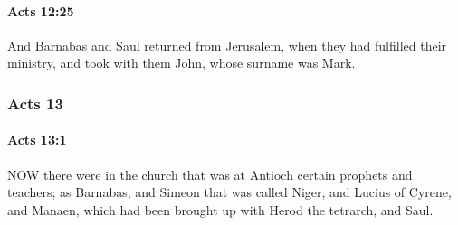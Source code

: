 		\paragraph{Acts 12:25} %
			\label{ACTS-12-25}

			And Barnabas and Saul returned from Jerusalem, when they had fulfilled their ministry, and took with them John, whose surname was Mark.

			\begin{framed}
			\scriptsize
				\begin{compactdesc}
					\item[SBLG] 
				\end{compactdesc}
			\end{framed}

	\subsubsection{Acts 13} %
		\label{ACTS-13}
		
		\paragraph{Acts 13:1} %
			\label{ACTS-13-1}

			NOW there were in the church that was at Antioch certain prophets and teachers; as Barnabas, and Simeon that was called Niger, and Lucius of Cyrene, and Manaen, which had been brought up with Herod the tetrarch, and Saul.

